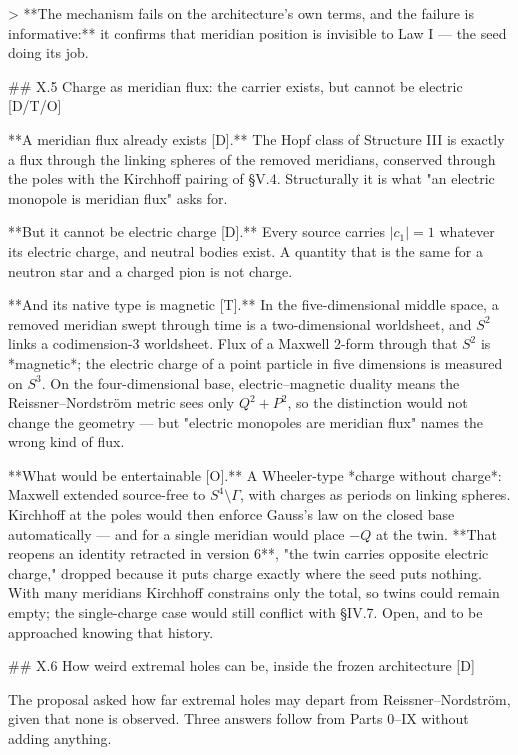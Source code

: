 > **The mechanism fails on the architecture's own terms, and the failure is informative:** it confirms that meridian position is invisible to Law I — the seed doing its job.

## X.5 Charge as meridian flux: the carrier exists, but cannot be electric [D/T/O]

**A meridian flux already exists [D].** The Hopf class of Structure III is exactly a flux through the linking spheres of the removed meridians, conserved through the poles with the Kirchhoff pairing of §V.4. Structurally it is what "an electric monopole is meridian flux" asks for.

**But it cannot be electric charge [D].** Every source carries $|c_1| = 1$ whatever its electric charge, and neutral bodies exist. A quantity that is the same for a neutron star and a charged pion is not charge.

**And its native type is magnetic [T].** In the five-dimensional middle space, a removed meridian swept through time is a two-dimensional worldsheet, and $S^2$ links a codimension-3 worldsheet. Flux of a Maxwell 2-form through that $S^2$ is *magnetic*; the electric charge of a point particle in five dimensions is measured on $S^3$. On the four-dimensional base, electric–magnetic duality means the Reissner–Nordström metric sees only $Q^2+P^2$, so the distinction would not change the geometry — but "electric monopoles are meridian flux" names the wrong kind of flux.

**What would be entertainable [O].** A Wheeler-type *charge without charge*: Maxwell extended source-free to $S^4\setminus\Gamma$, with charges as periods on linking spheres. Kirchhoff at the poles would then enforce Gauss's law on the closed base automatically — and for a single meridian would place $-Q$ at the twin. **That reopens an identity retracted in version 6**, "the twin carries opposite electric charge," dropped because it puts charge exactly where the seed puts nothing. With many meridians Kirchhoff constrains only the total, so twins could remain empty; the single-charge case would still conflict with §IV.7. Open, and to be approached knowing that history.

## X.6 How weird extremal holes can be, inside the frozen architecture [D]

The proposal asked how far extremal holes may depart from Reissner–Nordström, given that none is observed. Three answers follow from Parts 0–IX without adding anything.

